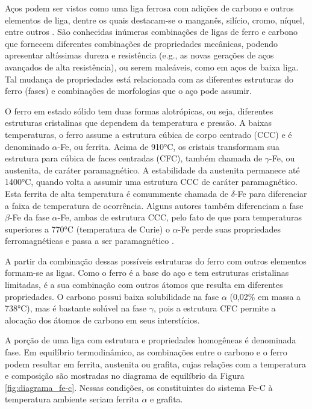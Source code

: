 \documentclass[brazil,tf,epusp]{usp}  %
\begin{document}
Aços podem ser vistos como uma liga ferrosa com adições de carbono e outros elementos de liga, dentre os quais destacam-se o manganês, silício, cromo, níquel, entre outros \cite{Dossett2006}. São conhecidas inúmeras combinações de ligas de ferro e carbono que fornecem diferentes combinações de propriedades mecânicas, podendo apresentar altíssimas dureza e resistência (e.g., as novas gerações de aços avançados de alta resistência), ou serem maleáveis, como em aços de baixa liga. Tal mudança de propriedades está relacionada com as diferentes estruturas do ferro (fases) e combinações de morfologias que o aço pode assumir.

O ferro em estado sólido tem duas formas alotrópicas, ou seja, diferentes estruturas cristalinas que dependem da temperatura e pressão. A baixas temperaturas, o ferro assume a estrutura cúbica de corpo centrado (CCC) e é denominado $\alpha$-Fe, ou ferrita. Acima de 910°C, os cristais transformam sua estrutura para cúbica de faces centradas (CFC), também chamada de $\gamma$-Fe, ou austenita, de caráter paramagnético. A estabilidade da austenita permanece até 1400°C, quando volta a assumir uma estrutura CCC de caráter paramagnético. Esta ferrita de alta temperatura é comummente chamada de $\delta$-Fe para diferenciar a faixa de temperatura de ocorrência. Alguns autores também diferenciam a fase $\beta$-Fe da fase $\alpha$-Fe, ambas de estrutura CCC, pelo fato de que para temperaturas superiores a 770°C (temperatura de Curie) o $\alpha$-Fe perde suas propriedades ferromagnéticas e passa a ser paramagnético \cite{Totten2006}.

A partir da combinação dessas possíveis estruturas do ferro com outros elementos formam-se as ligas. Como o ferro é a base do aço e tem estruturas cristalinas limitadas, é a sua combinação com outros átomos que resulta em diferentes propriedades. O carbono possui baixa solubilidade na fase $\alpha$ (0,02\% em massa a 738°C), mas é bastante solúvel na fase $\gamma$, pois a estrutura CFC permite a alocação dos átomos de carbono em seus interstícios.

A porção de uma liga com estrutura e propriedades homogêneas é denominada fase. Em equilíbrio termodinâmico, as combinações entre o carbono e o ferro podem resultar em ferrita, austenita ou grafita, cujas relações com a temperatura e composição são mostradas no diagrama de equilíbrio da Figura \ref{fig:diagrama_fe-c}. Nessas condições, os constituintes do sistema Fe-C à temperatura ambiente seriam ferrita $\alpha$ e grafita.
\end{document}
